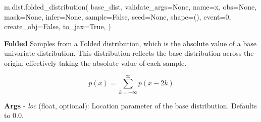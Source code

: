 \documentclass[
  letterpaper,
  DIV=11,
  numbers=noendperiod]{scrartcl}
\newenvironment{Shaded}{\begin{snugshade}}{\end{snugshade}}
\newcommand{\DecValTok}[1]{\textcolor[rgb]{0.68,0.00,0.00}{#1}}
\newcommand{\NormalTok}[1]{\textcolor[rgb]{0.00,0.23,0.31}{#1}}
\newcommand{\OperatorTok}[1]{\textcolor[rgb]{0.37,0.37,0.37}{#1}}
\newcommand{\StringTok}[1]{\textcolor[rgb]{0.13,0.47,0.30}{#1}}
\newcommand{\VariableTok}[1]{\textcolor[rgb]{0.07,0.07,0.07}{#1}}
\begin{document}
\begin{Shaded}
\begin{Highlighting}[]
\NormalTok{m.dist.folded\_distribution(}
\NormalTok{    base\_dist,}
\NormalTok{    validate\_args}\OperatorTok{=}\VariableTok{None}\NormalTok{,}
\NormalTok{    name}\OperatorTok{=}\StringTok{\textquotesingle{}x\textquotesingle{}}\NormalTok{,}
\NormalTok{    obs}\OperatorTok{=}\VariableTok{None}\NormalTok{,}
\NormalTok{    mask}\OperatorTok{=}\VariableTok{None}\NormalTok{,}
\NormalTok{    infer}\OperatorTok{=}\VariableTok{None}\NormalTok{,}
\NormalTok{    sample}\OperatorTok{=}\VariableTok{False}\NormalTok{,}
\NormalTok{    seed}\OperatorTok{=}\VariableTok{None}\NormalTok{,}
\NormalTok{    shape}\OperatorTok{=}\NormalTok{(),}
\NormalTok{    event}\OperatorTok{=}\DecValTok{0}\NormalTok{,}
\NormalTok{    create\_obj}\OperatorTok{=}\VariableTok{False}\NormalTok{,}
\NormalTok{    to\_jax}\OperatorTok{=}\VariableTok{True}\NormalTok{,}
\NormalTok{)}
\end{Highlighting}
\end{Shaded}

\textbf{Folded} Samples from a Folded distribution, which is the
absolute value of a base univariate distribution. This distribution
reflects the base distribution across the origin, effectively taking the
absolute value of each sample.

\[
   p(x) = \sum_{k=-\infty}^{\infty} p(x - 2k)
\]

\textbf{Args} - \emph{loc} (float, optional): Location parameter of the
base distribution. Defaults to 0.0.
\end{document}
